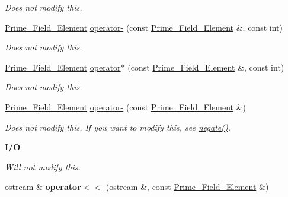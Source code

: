 \begin{Indent}
\begin{DoxyCompactItemize}
\begin{DoxyCompactList}\small\item\em Does not modify {\ttfamily this}. \end{DoxyCompactList}\item 
\mbox{\label{class_prime___field___element_accac0f77357d7389ac1fc8613be39d72}} 
\hyperlink{class_prime___field___element}{Prime\+\_\+\+Field\+\_\+\+Element} \hyperlink{class_prime___field___element_accac0f77357d7389ac1fc8613be39d72}{operator-\/} (const \hyperlink{class_prime___field___element}{Prime\+\_\+\+Field\+\_\+\+Element} \&, const int)
\begin{DoxyCompactList}\small\item\em Does not modify {\ttfamily this}. \end{DoxyCompactList}\item 
\mbox{\label{class_prime___field___element_a71eef3b2216feb8fdb024cf603b7663a}} 
\hyperlink{class_prime___field___element}{Prime\+\_\+\+Field\+\_\+\+Element} \hyperlink{class_prime___field___element_a71eef3b2216feb8fdb024cf603b7663a}{operator$\ast$} (const \hyperlink{class_prime___field___element}{Prime\+\_\+\+Field\+\_\+\+Element} \&, const int)
\begin{DoxyCompactList}\small\item\em Does not modify {\ttfamily this}. \end{DoxyCompactList}\item 
\mbox{\label{class_prime___field___element_ad1438eeaa8a2c75ca905dac604f8cebd}} 
\hyperlink{class_prime___field___element}{Prime\+\_\+\+Field\+\_\+\+Element} \hyperlink{class_prime___field___element_ad1438eeaa8a2c75ca905dac604f8cebd}{operator-\/} (const \hyperlink{class_prime___field___element}{Prime\+\_\+\+Field\+\_\+\+Element} \&)
\begin{DoxyCompactList}\small\item\em Does not modify {\ttfamily this}. If you want to modify {\ttfamily this}, see \hyperlink{class_prime___field___element_ab64fb1e850fb81bcf03345e11f5b6fb7}{negate()}. \end{DoxyCompactList}\end{DoxyCompactItemize}
\end{Indent}
\begin{Indent}\textbf{ I/O}\par
{\em Will not modify {\ttfamily this}. }\begin{DoxyCompactItemize}
\item 
\mbox{\label{class_prime___field___element_a7b56125cbfdccee3e56a80ed7987d2cc}} 
ostream \& {\bfseries operator$<$$<$} (ostream \&, const \hyperlink{class_prime___field___element}{Prime\+\_\+\+Field\+\_\+\+Element} \&)
\end{DoxyCompactItemize}
\end{Indent}


